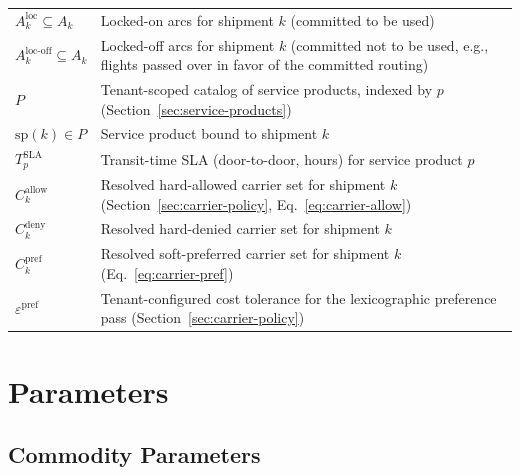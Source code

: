 \documentclass[11pt,a4paper]{article}
\theoremstyle{definition}
\begin{document}
\begin{center}
\begin{tabular}{lp{11.5cm}}
$A_k^{\text{loc}} \subseteq A_k$ & Locked-on arcs for shipment $k$ (committed to be used) \\
$A_k^{\text{loc-off}} \subseteq A_k$ & Locked-off arcs for shipment $k$ (committed not to be used, e.g., flights passed over in favor of the committed routing) \\
$P$ & Tenant-scoped catalog of service products, indexed by $p$ (Section~\ref{sec:service-products}) \\
$\text{sp}(k) \in P$ & Service product bound to shipment $k$ \\
$T_p^{\text{SLA}}$ & Transit-time SLA (door-to-door, hours) for service product $p$ \\
$C_k^{\text{allow}}$ & Resolved hard-allowed carrier set for shipment $k$ (Section~\ref{sec:carrier-policy}, Eq.~\ref{eq:carrier-allow}) \\
$C_k^{\text{deny}}$ & Resolved hard-denied carrier set for shipment $k$ \\
$C_k^{\text{pref}}$ & Resolved soft-preferred carrier set for shipment $k$ (Eq.~\ref{eq:carrier-pref}) \\
$\varepsilon^{\text{pref}}$ & Tenant-configured cost tolerance for the lexicographic preference pass (Section~\ref{sec:carrier-policy}) \\
\bottomrule
\end{tabular}
\end{center}

\section{Parameters}

\subsection{Commodity Parameters}
\end{document}
